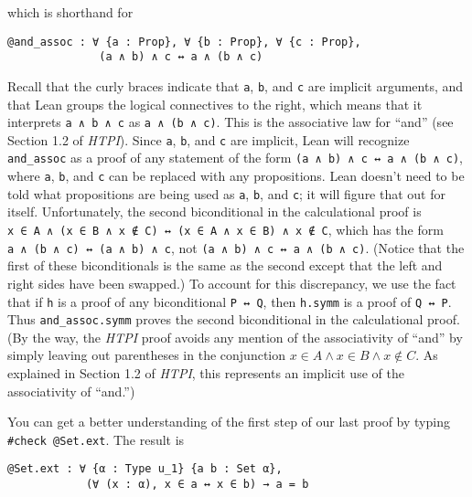 \documentclass[
  letterpaper,
  DIV=11,
  numbers=noendperiod]{scrreprt}
\newenvironment{ind}
	{\begin{list}{}{\setlength{\leftmargin}{1em}}\item\relax}
	{\end{list}}
\theoremstyle{remark}
\begin{document}
which is shorthand for

\begin{ind}

\begin{verbatim}
@and_assoc : ∀ {a : Prop}, ∀ {b : Prop}, ∀ {c : Prop},
              (a ∧ b) ∧ c ↔ a ∧ (b ∧ c)
\end{verbatim}

\end{ind}

Recall that the curly braces indicate that \texttt{a}, \texttt{b}, and
\texttt{c} are implicit arguments, and that Lean groups the logical
connectives to the right, which means that it interprets
\texttt{a\ ∧\ b\ ∧\ c} as \texttt{a\ ∧\ (b\ ∧\ c)}. This is the
associative law for ``and'' (see Section 1.2 of \emph{HTPI}). Since
\texttt{a}, \texttt{b}, and \texttt{c} are implicit, Lean will recognize
\texttt{and\_assoc} as a proof of any statement of the form
\texttt{(a\ ∧\ b)\ ∧\ c\ ↔\ a\ ∧\ (b\ ∧\ c)}, where \texttt{a},
\texttt{b}, and \texttt{c} can be replaced with any propositions. Lean
doesn't need to be told what propositions are being used as \texttt{a},
\texttt{b}, and \texttt{c}; it will figure that out for itself.
Unfortunately, the second biconditional in the calculational proof is
\texttt{x\ ∈\ A\ ∧\ (x\ ∈\ B\ ∧\ x\ ∉\ C)\ ↔\ (x\ ∈\ A\ ∧\ x\ ∈\ B)\ ∧\ x\ ∉\ C},
which has the form \texttt{a\ ∧\ (b\ ∧\ c)\ ↔\ (a\ ∧\ b)\ ∧\ c}, not
\texttt{(a\ ∧\ b)\ ∧\ c\ ↔\ a\ ∧\ (b\ ∧\ c)}. (Notice that the first of
these biconditionals is the same as the second except that the left and
right sides have been swapped.) To account for this discrepancy, we use
the fact that if \texttt{h} is a proof of any biconditional
\texttt{P\ ↔\ Q}, then \texttt{h.symm} is a proof of \texttt{Q\ ↔\ P}.
Thus \texttt{and\_assoc.symm} proves the second biconditional in the
calculational proof. (By the way, the \emph{HTPI} proof avoids any
mention of the associativity of ``and'' by simply leaving out
parentheses in the conjunction
\(x \in A \wedge x \in B \wedge x \notin C\). As explained in Section
1.2 of \emph{HTPI}, this represents an implicit use of the associativity
of ``and.'')

You can get a better understanding of the first step of our last proof
by typing \texttt{\#check\ @Set.ext}. The result is

\begin{ind}

\begin{verbatim}
@Set.ext : ∀ {α : Type u_1} {a b : Set α},
            (∀ (x : α), x ∈ a ↔ x ∈ b) → a = b
\end{verbatim}

\end{ind}
\end{document}
